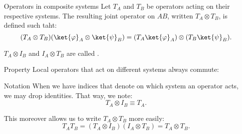 \documentclass[a4paper]{article}
\begin{document}
\begin{parag}{Operators in composite systems}
    Let $T_A$ and $T_B$ be operators acting on their respective systems. The resulting joint operator on $AB$, written $T_A \otimes T_B$, is defined such taht: 
    \[\left(T_A \otimes T_B\right) \left(\ket{\phi}_A \otimes \ket{\psi}_B\right) = \left(T_A \ket{\phi}_A\right) \otimes \left(T_B \ket{\psi}_B\right).\]

    $T_A \otimes I_B$ and $I_A \otimes T_B$ are called . 

    \begin{subparag}{Property}
        Local operators that act on different systems always commute: 
    \end{subparag}
    
    \begin{subparag}{Notation}
        When we have indices that denote on which system an operator acts, we may drop identities. That way, we note: 
        \[T_A \otimes I_B \equiv T_A.\]

        This moreover allows us to write $T_A \otimes T_B$ more easily: 
        \[T_A T_B = \left(T_A \otimes I_B\right) \left(I_A \otimes T_B\right) = T_A \otimes T_B.\]
    \end{subparag}
\end{parag}
\end{document}
